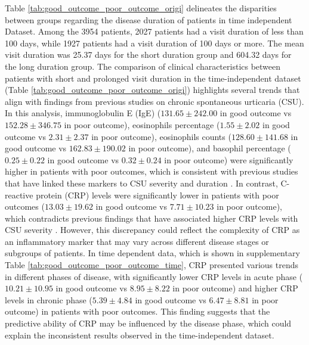 \documentclass[final,1p,times,authoryear]{elsarticle}
\begin{document}
Table \ref{tab:good_outcome_poor_outcome_origi} delineates the disparities between groups regarding the disease duration of patients in time independent Dataset. Among the 3954 patients, 2027 patients had a visit duration of less than 100 days, while 1927 patients had a visit duration of 100 days or more. The mean visit duration was 25.37 days for the short duration group and 604.32 days for the long duration group. The comparison of clinical characteristics between patients with short and prolonged visit duration in the time-independent dataset (Table \ref{tab:good_outcome_poor_outcome_origi}) highlights several trends that align with findings from previous studies on chronic spontaneous urticaria (CSU). In this analysis, immunoglobulin E (IgE) ($131.65 \pm 242.00$ in good outcome vs $152.28 \pm 346.75$ in poor outcome), eosinophils percentage ($1.55 \pm 2.02$ in good outcome vs $2.31 \pm 2.37$ in poor outcome), eosinophils counts ($128.60 \pm 141.68$ in good outcome vs $162.83 \pm 190.02$ in poor outcome), 
and basophil percentage ($0.25 \pm 0.22$ in good outcome vs $0.32 \pm 0.24$ in poor outcome) were significantly higher in patients with poor outcomes, which is consistent with previous studies that have linked these markers to CSU severity and duration \citep{SanchezBorges2017Factors,Rabelo-Filardi2013Parameters, Kolkhir2019Eosinopenia}. In contrast, C-reactive protein (CRP) levels were significantly lower in patients with poor outcomes ($13.03 \pm 19.62$ in good outcome vs $7.71 \pm 10.23$ in poor outcome), which contradicts previous findings that have associated higher CRP levels with CSU severity \citep{Rabelo-Filardi2013Parameters}. However, this discrepancy could reflect the complexity of CRP as an inflammatory marker that may vary across different disease stages or subgroups of patients. In time dependent data, which is shown in supplementary Table \ref{tab:good_outcome_poor_outcome_time}, CRP presented various trends in different phases of disease, with significantly lower CRP levels in acute phase ($10.21 \pm 10.95$ in good outcome vs $8.95 \pm 8.22$ in poor outcome) and higher CRP levels in chronic phase ($5.39 \pm 4.84$ in good outcome vs $6.47 \pm 8.81$ in poor outcome) in patients with poor outcomes. This finding suggests that the predictive ability of CRP may be influenced by the disease phase, which could explain the inconsistent results observed in the time-independent dataset.
\end{document}
